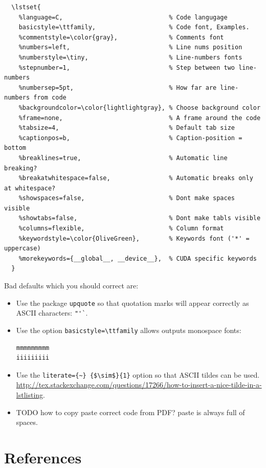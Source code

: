 \documentclass[12pt]{article}
\begin{document}
\begin{lstlisting}
  \lstset{
    %language=C,                             % Code langugage
    basicstyle=\ttfamily,                    % Code font, Examples.
    %commentstyle=\color{gray},              % Comments font
    %numbers=left,                           % Line nums position
    %numberstyle=\tiny,                      % Line-numbers fonts
    %stepnumber=1,                           % Step between two line-numbers
    %numbersep=5pt,                          % How far are line-numbers from code
    %backgroundcolor=\color{lightlightgray}, % Choose background color
    %frame=none,                             % A frame around the code
    %tabsize=4,                              % Default tab size
    %captionpos=b,                           % Caption-position = bottom
    %breaklines=true,                        % Automatic line breaking?
    %breakatwhitespace=false,                % Automatic breaks only at whitespace?
    %showspaces=false,                       % Dont make spaces visible
    %showtabs=false,                         % Dont make tabls visible
    %columns=flexible,                       % Column format
    %keywordstyle=\color{OliveGreen},        % Keywords font ('*' = uppercase)
    %morekeywords={__global__, __device__},  % CUDA specific keywords
  }
\end{lstlisting}

Bad defaults which you should correct are:

\begin{itemize}
\item
Use the package \lstinline|upquote| so that quotation marks will appear
correctly as ASCII characters: \lstinline|"'`|.
\item
Use the option \lstinline|basicstyle=\ttfamily| allows outputs monospace fonts:
\begin{lstlisting}
mmmmmmmmm
iiiiiiiii
\end{lstlisting}
\item
Use the \lstinline|literate={~} {$\sim$}{1}| option so that ASCII tildes can be used. \url{http://tex.stackexchange.com/questions/17266/how-to-insert-a-nice-tilde-in-a-lstlisting}.
\item TODO how to copy paste correct code from PDF? paste is always full of spaces.
\end{itemize}

\section{References}\label{references}
\end{document}
